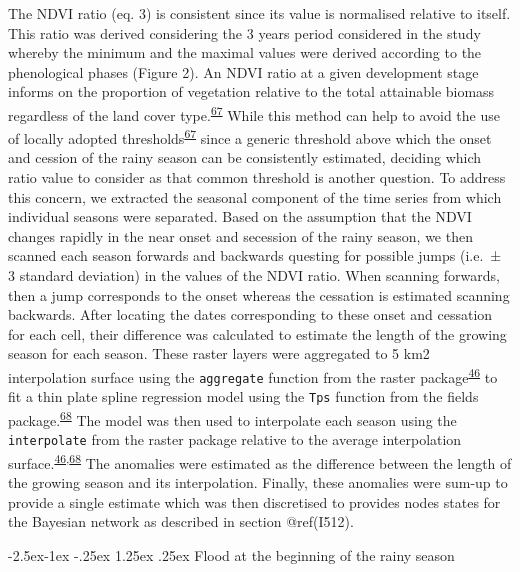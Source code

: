 \documentclass[12pt,oneside]{article}
\makeatletter
\renewcommand\paragraph{\@startsection{paragraph}{4}{\z@}%
            {-2.5ex\@plus -1ex \@minus -.25ex}%
            {1.25ex \@plus .25ex}%
            {\normalfont\normalsize\bfseries}}
\makeatother
\begin{document}
The NDVI ratio (eq. 3) is consistent since its value is normalised relative to itself. This ratio was derived considering the 3 years period considered in the study whereby the minimum and the maximal values were derived according to the phenological phases (Figure 2). An NDVI ratio at a given development stage informs on the proportion of vegetation relative to the total attainable biomass regardless of the land cover type.\textsuperscript{\protect\hyperlink{ref-White_et_al_1997}{67}} While this method can help to avoid the use of locally adopted thresholds\textsuperscript{\protect\hyperlink{ref-White_et_al_1997}{67}} since a generic threshold above which the onset and cession of the rainy season can be consistently estimated, deciding which ratio value to consider as that common threshold is another question. To address this concern, we extracted the seasonal component of the time series from which individual seasons were separated. Based on the assumption that the NDVI changes rapidly in the near onset and secession of the rainy season, we then scanned each season forwards and backwards questing for possible jumps (i.e.~± 3 standard deviation) in the values of the NDVI ratio. When scanning forwards, then a jump corresponds to the onset whereas the cessation is estimated scanning backwards. After locating the dates corresponding to these onset and cessation for each cell, their difference was calculated to estimate the length of the growing season for each season. These raster layers were aggregated to 5 km2 interpolation surface using the \texttt{aggregate} function from the raster package\textsuperscript{\protect\hyperlink{ref-Hijmans_2019}{46}} to fit a thin plate spline regression model using the \texttt{Tps} function from the fields package.\textsuperscript{\protect\hyperlink{ref-Nychka_et_al_2018}{68}} The model was then used to interpolate each season using the \texttt{interpolate} from the raster package relative to the average interpolation surface.\textsuperscript{\protect\hyperlink{ref-Hijmans_2019}{46},\protect\hyperlink{ref-Nychka_et_al_2018}{68}} The anomalies were estimated as the difference between the length of the growing season and its interpolation. Finally, these anomalies were sum-up to provide a single estimate which was then discretised to provides nodes states for the Bayesian network as described in section @ref(I512).

\hypertarget{I529}{%
\paragraph{Flood at the beginning of the rainy season}\label{I529}}
\end{document}
